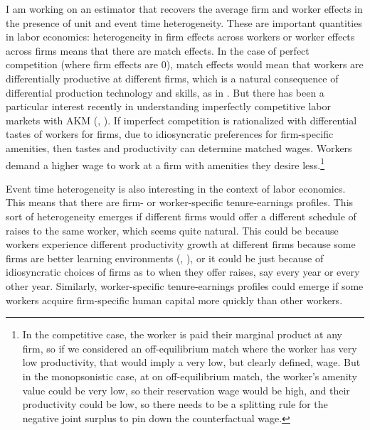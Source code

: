 \documentclass{article}
\begin{document}
I am working on %
an estimator that recovers the average firm and worker effects in the presence of unit and event time heterogeneity. These are important quantities in labor economics: heterogeneity in firm effects across workers or worker effects across firms means that there are match effects. In the case of perfect competition (where firm effects are 0), match effects would mean that workers are differentially productive at different firms, which is a natural consequence of differential production technology and skills, as in \citet{roy1951some}. But there has been a particular interest recently in understanding imperfectly competitive labor markets with AKM (\citealp{card2018firms}, \citealp{lamadon2022imperfect}). If imperfect competition is rationalized with differential tastes of workers for firms, due to idiosyncratic preferences for firm-specific amenities, then tastes and productivity can determine matched wages. Workers demand a higher wage to work at a firm with amenities they desire less.\footnote{In the competitive case, the worker is paid their marginal product at any firm, so if we considered an off-equilibrium match where the worker has very low productivity, that would imply a very low, but clearly defined, wage. But in the monopsonistic case, at on off-equilibrium match, the worker's amenity value could be very low, so their reservation wage would be high, and their productivity could be low, so there needs to be a splitting rule for the negative joint surplus to pin down the counterfactual wage.}

Event time heterogeneity is also interesting in the context of labor economics. This means that there are firm- or worker-specific tenure-earnings profiles. This sort of heterogeneity emerges if different firms would offer a different schedule of raises to the same worker, which seems quite natural. This could be because workers experience different productivity growth at different firms because some firms are better learning environments (\citealp{jarosch2021learning}, \citealp{gregory2020firms}), or it could be just because of idiosyncratic choices of firms as to when they offer raises, say every year or every other year. Similarly, worker-specific tenure-earnings profiles could emerge if some workers acquire firm-specific human capital more quickly than other workers.
\end{document}
